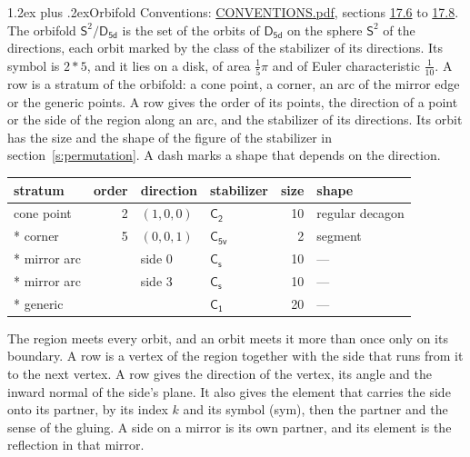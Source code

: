 \documentclass[10pt,a4paper]{article}
\makeatletter
\renewcommand\section{\@startsection{section}{1}{\z@}{-3ex plus -1ex minus -.2ex}%
  {1.2ex plus .2ex}{\normalfont\large\sffamily\bfseries\color{parttitle}}}
\numberwithin{equation}{section}
\newcommand{\grp}[1]{\mathsf{#1}}
\newcommand{\orbname}[1]{#1}
\newcommand{\dirvec}[3]{(#1, #2, #3)}
\newcommand{\twosphere}{\mathsf{S}^{2}}
\makeatother
\begin{document}
\section{Orbifold}\label{s:orbifold}
Conventions: \href{../../CONVENTIONS.pdf}{CONVENTIONS.pdf}, sections \href{../../CONVENTIONS.pdf\#conv.17.6}{17.6} to \href{../../CONVENTIONS.pdf\#conv.17.8}{17.8}.
The orbifold $\twosphere/\grp{D_{5d}}$ is the set of the orbits of $\grp{D_{5d}}$ on the sphere $\twosphere$ of the directions, each orbit marked by the class of the stabilizer of its directions. Its symbol is $\orbname{2{\ast}5}$, and it lies on a disk, of area $\tfrac{1}{5}\pi$ and of Euler characteristic $\tfrac{1}{10}$.
\leavevmode\label{n:head.stratum}\label{n:head.order.point}\label{n:head.direction}\label{n:head.stabilizer}\label{n:head.size.orbit}\label{n:head.shape}A row is a stratum of the orbifold: a cone point, a corner, an arc of the mirror edge or the generic points. A row gives the order of its points, the direction of a point or the side of the region along an arc, and the stabilizer of its directions. Its orbit has the size and the shape of the figure of the stabilizer in section~\ref{s:permutation}. A dash marks a shape that depends on the direction.
{\small\setlength{\tabcolsep}{4pt}\begin{longtable}{@{}lrllrl@{}}\toprule
stratum & order & direction & stabilizer & size & shape\\\midrule\endhead
\bottomrule\endfoot\endlastfoot
cone point & 2 & $\dirvec{1}{0}{0}$ & \href{C2.pdf}{$\grp{C_{2}}$} & 10 & regular decagon\\*
corner & 5 & $\dirvec{0}{0}{1}$ & \href{C5v.pdf}{$\grp{C_{5v}}$} & 2 & segment\\*
mirror arc &  & side 0 & \href{C1v.pdf}{$\grp{C_{s}}$} & 10 & ---\\*
mirror arc &  & side 3 & \href{C1v.pdf}{$\grp{C_{s}}$} & 10 & ---\\*
generic &  &  & \href{C1.pdf}{$\grp{C_{1}}$} & 20 & ---\\
\bottomrule\end{longtable}}
\leavevmode\label{n:head.vertex.region}\label{n:head.angle}\label{n:head.normal.side}\label{n:head.partner}\label{n:head.sense}The region meets every orbit, and an orbit meets it more than once only on its boundary. A row is a vertex of the region together with the side that runs from it to the next vertex. A row gives the direction of the vertex, its angle and the inward normal of the side's plane. It also gives the element that carries the side onto its partner, by its index $k$ and its symbol (sym), then the partner and the sense of the gluing. A side on a mirror is its own partner, and its element is the reflection in that mirror.
\end{document}

